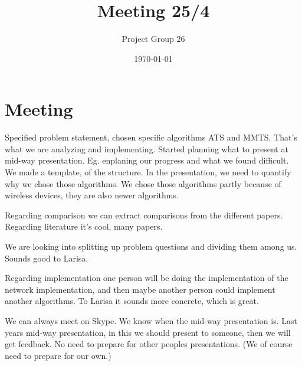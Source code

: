 \documentclass{article}
\title{Meeting 25/4}
\author{Project Group 26}
\date{\today}
\begin{document}
\maketitle

\section{Meeting}

Specified problem statement, chosen specific algorithms ATS and MMTS. That's what we are analyzing and implementing. Started planning what to present at mid-way presentation. Eg. enplaning our progress and what we found difficult. We made a template, of the structure. In the presentation, we need to quantify why we chose those algorithms. We chose those algorithms partly because of wireless devices, they are also newer algorithms.

Regarding comparison we can extract comparisons from the different papers. Regarding literature it's cool, many papers. 

We are looking into splitting up problem questions and dividing them among us. Sounds good to Larisa.

Regarding implementation one person will be doing the implementation of the network implementation, and then maybe another person could implement another algorithms. To Larisa it sounds more concrete, which is great.

We can always meet on Skype. We know when the mid-way presentation is. Last years mid-way presentation, in this we should present to someone, then we will get feedback. No need to prepare for other peoples presentations. (We of course need to prepare for our own.)
\end{document}
